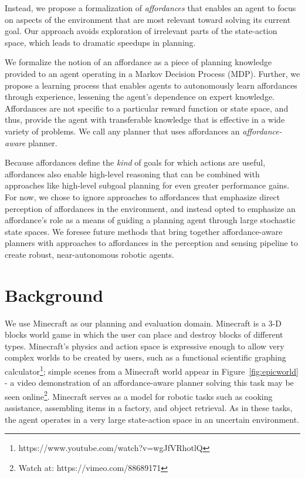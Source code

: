 \documentclass[conference]{IEEEtran}
\begin{document}
Instead, we propose a formalization of {\em affordances} \citep{gibson77} that enables an agent to focus on
aspects of the environment that are most relevant toward solving its current goal. Our approach avoids exploration of irrelevant parts of the 
state-action space, which leads to dramatic speedups in planning.

We formalize the notion of an affordance as a piece of planning
knowledge provided to an agent operating in a Markov Decision
Process (MDP). Further, we propose a learning process that
enables agents to autonomously learn affordances through experience, lessening
the agent's dependence on expert knowledge. Affordances are not specific to a particular reward 
function or state space, and thus, provide the agent with transferable 
knowledge that is effective in a wide variety of problems. We call any planner that
uses affordances an {\it affordance-aware} planner.

Because affordances define the {\em kind} of goals for which actions are useful,
affordances also enable high-level reasoning that can
be combined with approaches like high-level subgoal planning for even
greater performance gains. For now, we chose to ignore approaches to affordances that emphasize
direct perception of affordances in the environment, and instead opted to emphasize an
affordance's role as a means of guiding a planning agent through large stochastic state spaces. We foresee
future methods that bring together affordance-aware planners with approaches to affordances
in the perception and sensing pipeline to create robust, near-autonomous robotic agents.

\section{Background}
\label{sec:background}
We use Minecraft as our planning and evaluation domain. Minecraft is a
3-D blocks world game in which the user can place and destroy blocks
of different types.  Minecraft's physics and action space is expressive
enough to allow very complex worlds to be created by users, such as a
functional scientific graphing calculator\footnote{https://www.youtube.com/watch?v=wgJfVRhotlQ};
simple scenes from a Minecraft world appear in Figure~\ref{fig:epicworld} - a video demonstration of
an affordance-aware planner solving this task may be seen online\footnote{Watch at: https://vimeo.com/88689171}.
Minecraft serves as a model for robotic tasks such as cooking assistance, assembling items in a factory, 
and object retrieval.  As in these tasks, the agent operates in a very large state-action space in an uncertain environment.
\end{document}
